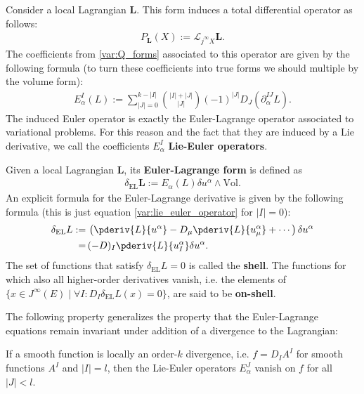     \begin{example}
        Consider a local Lagrangian $\mathbf{L}$. This form induces a total differential operator as follows:
        \begin{gather}
            P_{\mathbf{L}}(X) := \mathcal{L}_{j^\infty X}\mathbf{L}.
        \end{gather}
        The coefficients from \ref{var:Q_forms} associated to this operator are given by the following formula (to turn these coefficients into true forms we should multiple by the volume form):
        \begin{gather}
            \label{var:lie_euler_operator}
            E^I_\alpha(L) := \sum_{|J|=0}^{k-|I|}\binom{|I|+|J|}{|J|}(-1)^{|J|}D_J\left(\partial^{IJ}_\alpha L\right).
        \end{gather}
        The induced Euler operator is exactly the Euler-Lagrange operator associated to variational problems. For this reason and the fact that they are induced by a Lie derivative, we call the coefficients $E^I_\alpha$ \textbf{Lie-Euler operators}.

        Given a local Lagrangian $\mathbf{L}$, its \textbf{Euler-Lagrange form} is defined as
        \begin{gather}
            \delta_{\text{EL}}\mathbf{L} := E_\alpha(L)\delta u^\alpha\wedge\text{Vol}.
        \end{gather}
        An explicit formula for the Euler-Lagrange derivative is given by the following formula (this is just equation \ref{var:lie_euler_operator} for $|I|=0$):
        \begin{align}
            \label{var:euler_lagrange_derivative}
            \delta_{\text{EL}}L :=&\,\left(\pderiv{L}{u^\alpha} - D_\mu\pderiv{L}{u^\alpha_\mu} + \cdots\right)\delta u^\alpha\nonumber\\
            =&\,(-D)_I\pderiv{L}{u^\alpha_I}\delta u^\alpha.
        \end{align}
        The set of functions that satisfy $\delta_{\text{EL}}L=0$ is called the \textbf{shell}. The functions for which also all higher-order derivatives vanish, i.e. the elements of $\{x\in J^\infty(E)\mid \forall I:D_I\delta_{\text{EL}}L(x) = 0\}$, are said to be \textbf{on-shell}.
    \end{example}

    The following property generalizes the property that the Euler-Lagrange equations remain invariant under addition of a divergence to the Lagrangian:
    \begin{property}
        If a smooth function is locally an order-$k$ divergence, i.e. $f=D_IA^I$ for smooth functions $A^I$ and $|I|=l$, then the Lie-Euler operators $E^J_\alpha$ vanish on $f$ for all $|J|<l$.
    \end{property}

